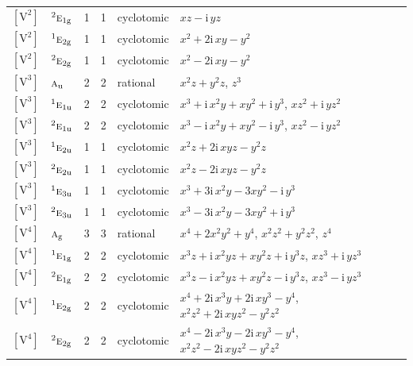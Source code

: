 \documentclass[10pt,a4paper]{article}
\numberwithin{equation}{section}
\newcommand{\irr}[1]{\text{\normalfont\scshape #1}}
\newcommand{\conjpair}[1]{{}^{#1}}
\newcommand{\ptag}[1]{\mathrm{#1}}
\newcommand{\iunit}{\mathrm{i}}
\newcommand{\jahn}[1]{\mathrm{#1}}
\newlength{\fillwidth}\newlength{\cellwidth}\newlength{\colwidth}
\begin{document}
{\begin{longtable}{@{}llrrl>{\RaggedRight\arraybackslash}p{\fillwidth}@{}}
$\jahn{[V^{2}]}$ & $\conjpair{2}\irr{e}_{1\ptag{g}}$ & 1 & 1 & cyclotomic & $xz - \iunit{}\,yz$\\
$\jahn{[V^{2}]}$ & $\conjpair{1}\irr{e}_{2\ptag{g}}$ & 1 & 1 & cyclotomic & $x^{2} + 2\iunit{}\,xy - y^{2}$\\
$\jahn{[V^{2}]}$ & $\conjpair{2}\irr{e}_{2\ptag{g}}$ & 1 & 1 & cyclotomic & $x^{2} - 2\iunit{}\,xy - y^{2}$\\
$\jahn{[V^{3}]}$ & $\irr{a}_{\ptag{u}}$ & 2 & 2 & rational & $x^{2}z + y^{2}z$, $z^{3}$\\
$\jahn{[V^{3}]}$ & $\conjpair{1}\irr{e}_{1\ptag{u}}$ & 2 & 2 & cyclotomic & $x^{3} + \iunit{}\,x^{2}y + xy^{2} + \iunit{}\,y^{3}$, $xz^{2} + \iunit{}\,yz^{2}$\\
$\jahn{[V^{3}]}$ & $\conjpair{2}\irr{e}_{1\ptag{u}}$ & 2 & 2 & cyclotomic & $x^{3} - \iunit{}\,x^{2}y + xy^{2} - \iunit{}\,y^{3}$, $xz^{2} - \iunit{}\,yz^{2}$\\
$\jahn{[V^{3}]}$ & $\conjpair{1}\irr{e}_{2\ptag{u}}$ & 1 & 1 & cyclotomic & $x^{2}z + 2\iunit{}\,xyz - y^{2}z$\\
$\jahn{[V^{3}]}$ & $\conjpair{2}\irr{e}_{2\ptag{u}}$ & 1 & 1 & cyclotomic & $x^{2}z - 2\iunit{}\,xyz - y^{2}z$\\
$\jahn{[V^{3}]}$ & $\conjpair{1}\irr{e}_{3\ptag{u}}$ & 1 & 1 & cyclotomic & $x^{3} + 3\iunit{}\,x^{2}y - 3xy^{2} - \iunit{}\,y^{3}$\\
$\jahn{[V^{3}]}$ & $\conjpair{2}\irr{e}_{3\ptag{u}}$ & 1 & 1 & cyclotomic & $x^{3} - 3\iunit{}\,x^{2}y - 3xy^{2} + \iunit{}\,y^{3}$\\
$\jahn{[V^{4}]}$ & $\irr{a}_{\ptag{g}}$ & 3 & 3 & rational & $x^{4} + 2x^{2}y^{2} + y^{4}$, $x^{2}z^{2} + y^{2}z^{2}$, $z^{4}$\\
$\jahn{[V^{4}]}$ & $\conjpair{1}\irr{e}_{1\ptag{g}}$ & 2 & 2 & cyclotomic & $x^{3}z + \iunit{}\,x^{2}yz + xy^{2}z + \iunit{}\,y^{3}z$, $xz^{3} + \iunit{}\,yz^{3}$\\
$\jahn{[V^{4}]}$ & $\conjpair{2}\irr{e}_{1\ptag{g}}$ & 2 & 2 & cyclotomic & $x^{3}z - \iunit{}\,x^{2}yz + xy^{2}z - \iunit{}\,y^{3}z$, $xz^{3} - \iunit{}\,yz^{3}$\\
$\jahn{[V^{4}]}$ & $\conjpair{1}\irr{e}_{2\ptag{g}}$ & 2 & 2 & cyclotomic & $x^{4} + 2\iunit{}\,x^{3}y + 2\iunit{}\,xy^{3} - y^{4}$, $x^{2}z^{2} + 2\iunit{}\,xyz^{2} - y^{2}z^{2}$\\
$\jahn{[V^{4}]}$ & $\conjpair{2}\irr{e}_{2\ptag{g}}$ & 2 & 2 & cyclotomic & $x^{4} - 2\iunit{}\,x^{3}y - 2\iunit{}\,xy^{3} - y^{4}$, $x^{2}z^{2} - 2\iunit{}\,xyz^{2} - y^{2}z^{2}$\\

\end{longtable}}
\end{document}
